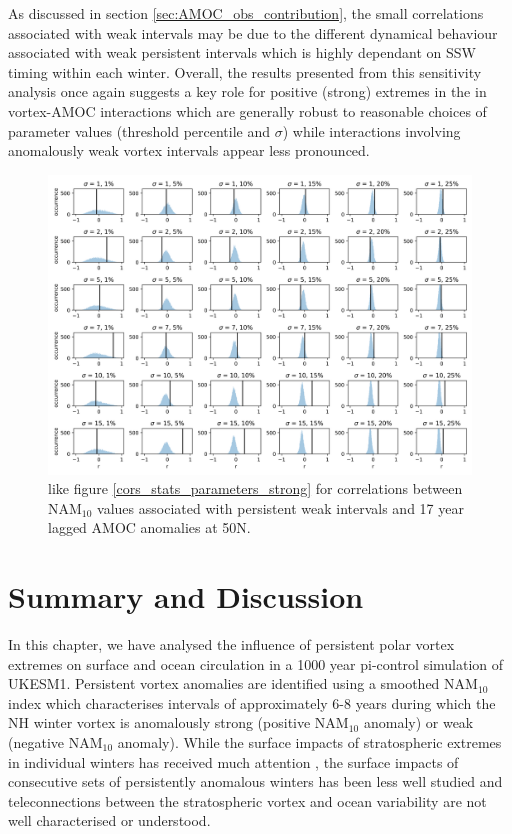 As discussed in section \ref{sec:AMOC_obs_contribution}, the small correlations associated with weak intervals may be due to the different dynamical behaviour associated with weak persistent intervals which is highly dependant on SSW timing within each winter. Overall, the results presented from this sensitivity analysis once again suggests a key role for positive (strong) extremes in the in vortex-AMOC interactions which are generally robust to reasonable choices of parameter values (threshold percentile and $\sigma$) while interactions involving anomalously weak vortex intervals appear less pronounced. 

\newpage
\begin{landscape}
\begin{figure}[h!]
\begin{center}
\noindent\includegraphics[width =0.9\linewidth]{Figures/Figures-surface/cors_sigs_thresh_and_sigma_weak.png} 
\caption{like figure \ref{cors_stats_parameters_strong} for correlations between NAM$_{10}$ values associated with persistent weak intervals and 17 year lagged AMOC anomalies at 50N.}
\label{cors_stats_parameters_weak}
\end{center}
\end{figure}
\end{landscape}


\section{Summary and Discussion}
In this chapter, we have analysed the influence of persistent polar vortex extremes on surface and ocean circulation in a 1000 year pi-control simulation of UKESM1. Persistent vortex anomalies are identified using a smoothed NAM$_{10}$ index which characterises intervals of approximately 6-8 years during which the NH winter vortex is anomalously strong (positive NAM$_{10}$ anomaly) or weak (negative NAM$_{10}$ anomaly). While the surface impacts of stratospheric extremes in individual winters has received much attention \citep{baldwinStratospheric2001a, domeisenEstimating2019, charlton-perezInfluence2018a}, the surface impacts of consecutive sets of persistently anomalous winters has been less well studied and teleconnections between the stratospheric vortex and ocean variability are not well characterised or understood. 

